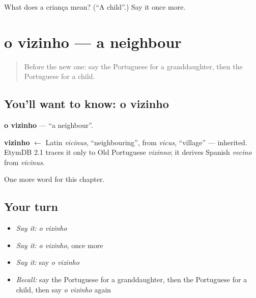 \begin{tcolorbox}[breakable,colback=teal!4,colframe=teal!35!black,title={Before you move on}]
What does a criança mean? (\textquotedblleft{}A child\textquotedblright{}.) Say it once more.
\end{tcolorbox}
\section[o vizinho]{o vizinho — a neighbour}

\label{lesson:PT-C39-vizinho}



\begin{quote}
Before the new one: say the Portuguese for a granddaughter, then the Portuguese for a child.
\end{quote}

\subsection*{You'll want to know: o vizinho}
\textbf{o vizinho} — \textquotedblleft{}a neighbour\textquotedblright{}.

\begin{cousinweb}
\textbf{vizinho} $\leftarrow$ Latin \emph{vicinus}, \textquotedblleft{}neighbouring\textquotedblright{}, from \emph{vicus}, \textquotedblleft{}village\textquotedblright{} — inherited. EtymDB 2.1 traces it only to Old Portuguese \emph{vizinno}; it derives Spanish \emph{vecino} from \emph{vicinus}.
\end{cousinweb}

\begin{grammarlens}[title={What you've built}]
One more word for this chapter.
\end{grammarlens}

\subsection*{Your turn}
\begin{itemize}
\raggedright
  \item \emph{Say it:} \emph{o vizinho}
  \item \emph{Say it:} \emph{o vizinho}, once more
  \item \emph{Say it:} say \emph{o vizinho}
  \item \emph{Recall:} say the Portuguese for a granddaughter, then the Portuguese for a child, then say \emph{o vizinho} again
\end{itemize}

